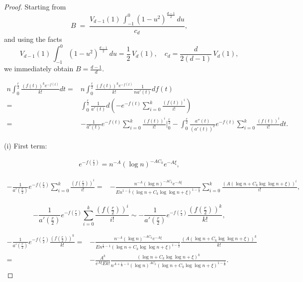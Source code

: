 \documentclass[preprint,12pt]{elsarticle}
\begin{document}
\begin{proof}
	
	Starting from
	$$
	B \;=\;\frac{V_{d-1}(1)\,\displaystyle\int_{-1}^{0}(1 - u^2)^{\frac{d-1}{2}}\,du}{c_d},
	$$
	and using the facts
	$$
	V_{d-1}(1)\,\int_{-1}^{0}(1 - u^2)^{\frac{d-1}{2}}\,du
	=\frac{1}{2}\,V_d(1),
	\quad
	c_d=\frac{d}{2(d-1)}\,V_d(1),
	$$
	we immediately obtain $B = \frac{d-1}{d}$.
	
	\begin{equation*}
		\begin{aligned}
			n\int_{0}^{\frac r2} \frac{(f(t))^ke^{-f(t)}}{k!}dt=&n\int_{0}^{\frac r2} \frac{(f(t))^ke^{-f(t)}}{k!} \frac{1}{na'(t)} df(t)\\
			=&   \int_{0}^{\frac r2} \frac{1}{a'(t)}d\left(-e^{-f(t)} \sum_{i=0}^{k}\frac{(f(t))^i}{i!}  \right)\\
			=&-\frac{1}{a'(t)}e^{-f(t)}\sum_{i=0}^{k}\frac{(f(t))^i}{i!}|_{0}^{\frac r2}
			-\int_{0}^{\frac r2} \frac{a''(t)}{(a'(t))^2}e^{-f(t)}\sum_{i=0}^{k}\frac{(f(t))^i}{i!}dt.
		\end{aligned}
	\end{equation*}
	
	(i) First term:
	
	
	\begin{equation*}
		\begin{aligned}
			e^{-f(\frac{r}{2})} = n^{-A} (\log n)^{-AC_k}e^{-A\xi},
		\end{aligned}
	\end{equation*}
	
	\begin{equation*}
		\begin{aligned}
			-\frac{1}{a'(\frac{r}{2})}e^{-f(\frac{r}{2})}\sum_{i=0}^{k}\frac{(f(\frac{r}{2}))^i}{i!} =& -\frac{n^{-A} (\log n)^{-AC_k}e^{-A\xi}}{E n^{1-\frac{1}{d}}\left(\log n+ C_k \log\log n+\xi\right)^{1-\frac{1}{d}}} \sum_{i=0}^k\frac{(A\left( \log n+ C_k \log\log n+\xi\right))^i}{i!},
		\end{aligned}
	\end{equation*}
	
	$$
	-\frac{1}{a'(\frac{r}{2})}e^{-f(\frac{r}{2})}\sum_{i=0}^{k}\frac{(f(\frac{r}{2}))^i}{i!} \sim -\frac{1}{a'(\frac{r}{2})}e^{-f(\frac{r}{2})}\frac{(f(\frac{r}{2}))^k}{k!},
	$$
	
	\begin{equation*}
		\begin{aligned}
			-\frac{1}{a'(\frac{r}{2})}e^{-f(\frac{r}{2})}\frac{(f(\frac{r}{2}))^k}{k!} =& -\frac{n^{-A} (\log n)^{-AC_k}e^{-A\xi}}{E n^{\frac{1}{d}-1}\left(\log n+ C_k \log\log n+\xi\right)^{1-\frac{1}{d}}}\frac{(A\left( \log n+ C_k \log\log n+\xi\right))^k}{k!} \\
			=& -\frac{A^k}{e^{A\xi}Ek!} \frac{\left( \log n+ C_k \log\log n+\xi\right)^k}{n^{A+\frac{1}{d}-1}(\log n)^{AC_k}\left(\log n+ C_k \log\log n+\xi\right)^{1-\frac{1}{d}}}.
		\end{aligned}
	\end{equation*}
	

\end{proof}
\end{document}
